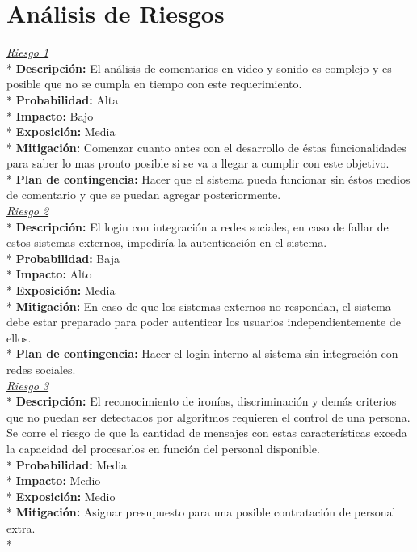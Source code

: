 \section{Análisis de Riesgos}
\uline{\it{Riesgo 1}}\\*
{\bf{Descripción:}} El análisis de comentarios en video y sonido es complejo y es posible que no se cumpla en tiempo con este requerimiento.\\*
{\bf{Probabilidad:}} Alta\\*
{\bf{Impacto:}} Bajo\\*
{\bf{Exposición:}} Media\\*
{\bf{Mitigación:}} Comenzar cuanto antes con el desarrollo de éstas funcionalidades para saber lo mas pronto posible si se va a llegar a cumplir con este objetivo.\\*
{\bf{Plan de contingencia:}} Hacer que el sistema pueda funcionar sin éstos medios de comentario y que se puedan agregar posteriormente.\\
\newline
\uline{\it{Riesgo 2}}\\*
{\bf{Descripción:}} El login con integración a redes sociales, en caso de fallar de estos sistemas externos,  impediría la autenticación en el sistema.\\*
{\bf{Probabilidad:}} Baja\\*
{\bf{Impacto:}} Alto\\*
{\bf{Exposición:}} Media\\*
{\bf{Mitigación:}} En caso de que los sistemas externos no respondan, el sistema debe estar preparado para poder autenticar los usuarios independientemente de ellos.\\*
{\bf{Plan de contingencia:}} Hacer el login interno al sistema sin integración con redes sociales.\\
\newline
\uline{\it{Riesgo 3}}\\*
{\bf{Descripción:}} El reconocimiento de ironías, discriminación y demás criterios que no puedan ser detectados por algoritmos requieren el control de una persona. Se corre el riesgo de que la cantidad de mensajes con estas características exceda la capacidad del procesarlos en función del personal disponible.\\*
{\bf{Probabilidad:}} Media\\*
{\bf{Impacto:}} Medio\\*
{\bf{Exposición:}} Medio\\*
{\bf{Mitigación:}} Asignar presupuesto para una posible contratación de personal extra.\\*
